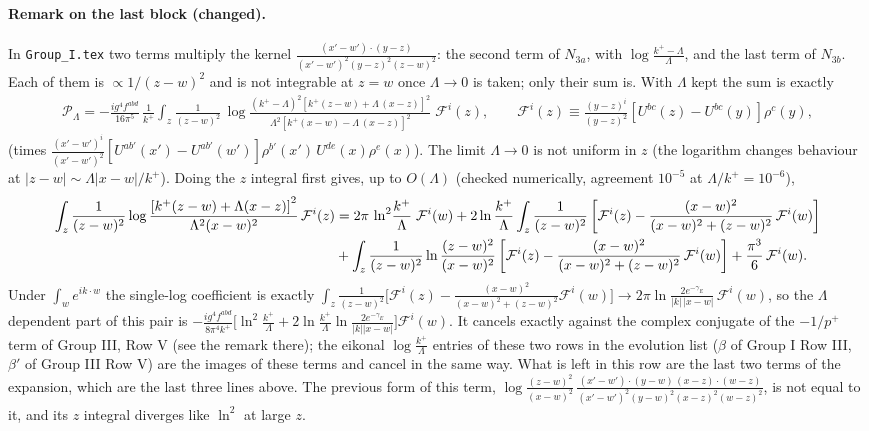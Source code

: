 \documentclass[9pt]{article}
\numberwithin{equation}{section}
\begin{document}
{\color{red}
\paragraph{Remark on the last block (changed).}
In \texttt{Group\_I.tex} two terms multiply the kernel $\frac{(x'-w')\cdot(y-z)}{(x'-w')^{2}(y-z)^{2}(z-w)^{2}}$: the second term of $N_{3a}$, with $\log\frac{k^{+}-\Lambda}{\Lambda}$, and the last term of $N_{3b}$. Each of them is $\propto 1/(z-w)^{2}$ and is not integrable at $z=w$ once $\Lambda\to0$ is taken; only their sum is. With $\Lambda$ kept the sum is exactly
\begin{align}
\mathcal{P}_{\Lambda}=-\frac{ig^{4}f^{abd}}{16\pi^{5}}\,\frac{1}{k^{+}}\int_{z}\frac{1}{(z-w)^{2}}\,\log\frac{(k^{+}-\Lambda)^{2}\left[k^{+}(z-w)+\Lambda\,(x-z)\right]^{2}}{\Lambda^{2}\left[k^{+}(x-w)-\Lambda\,(x-z)\right]^{2}}\;\mathcal{F}^{i}(z),\qquad
\mathcal{F}^{i}(z)\equiv\frac{(y-z)^{i}}{(y-z)^{2}}\left[U^{bc}(z)-U^{bc}(y)\right]\rho^{c}(y),
\end{align}
(times $\frac{(x'-w')^{i}}{(x'-w')^{2}}[U^{ab'}(x')-U^{ab'}(w')]\rho^{b'}(x')\,U^{de}(x)\rho^{e}(x)$). The limit $\Lambda\to0$ is not uniform in $z$ (the logarithm changes behaviour at $|z-w|\sim\Lambda|x-w|/k^{+}$). Doing the $z$ integral first gives, up to $O(\Lambda)$ (checked numerically, agreement $10^{-5}$ at $\Lambda/k^{+}=10^{-6}$),
\begin{align}
\int_{z}\frac{1}{(z-w)^{2}}\log\frac{\left[k^{+}(z-w)+\Lambda(x-z)\right]^{2}}{\Lambda^{2}(x-w)^{2}}\,\mathcal{F}^{i}(z)
&=2\pi\,\ln^{2}\!\frac{k^{+}}{\Lambda}\;\mathcal{F}^{i}(w)
+2\ln\frac{k^{+}}{\Lambda}\int_{z}\frac{1}{(z-w)^{2}}\left[\mathcal{F}^{i}(z)-\frac{(x-w)^{2}}{(x-w)^{2}+(z-w)^{2}}\,\mathcal{F}^{i}(w)\right]\notag\\
&+\int_{z}\frac{1}{(z-w)^{2}}\ln\frac{(z-w)^{2}}{(x-w)^{2}}\left[\mathcal{F}^{i}(z)-\frac{(x-w)^{2}}{(x-w)^{2}+(z-w)^{2}}\,\mathcal{F}^{i}(w)\right]+\frac{\pi^{3}}{6}\,\mathcal{F}^{i}(w).
\end{align}
Under $\int_{w}e^{ik\cdot w}$ the single-log coefficient is exactly $\int_{z}\frac{1}{(z-w)^{2}}\big[\mathcal{F}^{i}(z)-\frac{(x-w)^{2}}{(x-w)^{2}+(z-w)^{2}}\mathcal{F}^{i}(w)\big]\to 2\pi\ln\frac{2e^{-\gamma_{E}}}{|k|\,|x-w|}\,\mathcal{F}^{i}(w)$, so the $\Lambda$ dependent part of this pair is $-\frac{ig^{4}f^{abd}}{8\pi^{4}k^{+}}\big[\ln^{2}\frac{k^{+}}{\Lambda}+2\ln\frac{k^{+}}{\Lambda}\ln\frac{2e^{-\gamma_{E}}}{|k||x-w|}\big]\mathcal{F}^{i}(w)$. It cancels exactly against the complex conjugate of the $-1/p^{+}$ term of Group III, Row V (see the remark there); the eikonal $\log\frac{k^{+}}{\Lambda}$ entries of these two rows in the evolution list ($\beta$ of Group I Row III, $\beta'$ of Group III Row V) are the images of these terms and cancel in the same way. What is left in this row are the last two terms of the expansion, which are the last three lines above. The previous form of this term, $\log\frac{(z-w)^{2}}{(x-w)^{2}}\,\frac{(x'-w')\cdot(y-w)\,(x-z)\cdot(w-z)}{(x'-w')^{2}(y-w)^{2}(x-z)^{2}(w-z)^{2}}$, is not equal to it, and its $z$ integral diverges like $\ln^{2}$ at large $z$.
}
\end{document}
